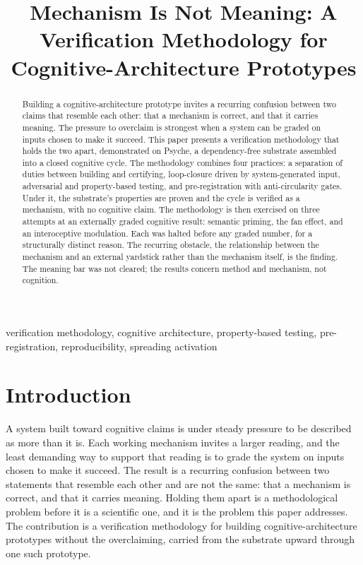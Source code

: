 \documentclass[conference]{IEEEtran}
\begin{document}
\title{Mechanism Is Not Meaning: A Verification Methodology for
       Cognitive-Architecture Prototypes}

\author{
  }

\maketitle

\begin{abstract}
Building a cognitive-architecture prototype invites a recurring confusion between two claims
that resemble each other: that a mechanism is correct, and that it carries meaning. The
pressure to overclaim is strongest when a system can be graded on inputs chosen to make it
succeed. This paper presents a verification methodology that holds the two apart, demonstrated
on Psyche, a dependency-free substrate assembled into a closed cognitive cycle. The methodology
combines four practices: a separation of duties between building and certifying, loop-closure
driven by system-generated input, adversarial and property-based testing, and pre-registration
with anti-circularity gates. Under it, the substrate's properties are proven and the cycle is
verified as a mechanism, with no cognitive claim. The methodology is then exercised on three
attempts at an externally graded cognitive result: semantic priming, the fan effect, and an
interoceptive modulation. Each was halted before any graded number, for a structurally distinct
reason. The recurring obstacle, the relationship between the mechanism and an external yardstick
rather than the mechanism itself, is the finding. The meaning bar was not cleared; the results
concern method and mechanism, not cognition.
\end{abstract}

\begin{IEEEkeywords}
verification methodology, cognitive architecture, property-based testing,
pre-registration, reproducibility, spreading activation
\end{IEEEkeywords}

\section{Introduction}\label{sec:intro}
A system built toward cognitive claims is under steady pressure to be described as
more than it is. Each working mechanism invites a larger reading, and the least
demanding way to support that reading is to grade the system on inputs chosen to make
it succeed. The result is a recurring confusion between two statements that resemble
each other and are not the same: that a mechanism is correct, and that it carries
meaning. Holding them apart is a methodological problem before it is a scientific one,
and it is the problem this paper addresses. The contribution is a verification
methodology for building cognitive-architecture prototypes without the overclaiming,
carried from the substrate upward through one such prototype.
\end{document}
